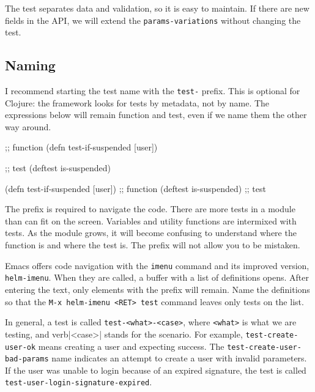 \fi

The test separates data and validation, so it is easy to maintain. If there are new fields in the API, we will extend the \verb|params-variations| without changing the test.

\subsection{Naming}

I recommend starting the test name with the \verb|test-| prefix. This is optional for Clojure: the framework looks for tests by metadata, not by name. The expressions below will remain function and test, even if we name them the other way around.

\ifx\DEVICETYPE\MOBILE

\begin{english}
  \begin{clojure}
;; function
(defn test-if-suspended [user])

;; test
(deftest is-suspended)
  \end{clojure}
\end{english}

\else

\begin{english}
  \begin{clojure}
(defn test-if-suspended [user]) ;; function
(deftest is-suspended)          ;; test
  \end{clojure}
\end{english}

\fi

The prefix is required to navigate the code. There are more tests in a module than can fit on the screen. Variables and utility functions are intermixed with tests. As the module grows, it will become confusing to understand where the function is and where the test is. The prefix will not allow you to be mistaken.


\mnoindent
Emacs offers code navigation with the \verb|imenu| command and its improved version, \verb|helm-imenu|. When they are called, a buffer with a list of definitions opens. After entering the text, only elements with the prefix will remain. Name the definitions so that the \verb|M-x helm-imenu <RET> test| command leaves only tests on the list.

In general, a test is called \verb|test-<what>-<case>|, where \verb|<what>| is what we are testing, and verb|<case>| stands for the scenario. For example, \verb|test-create-user-ok| means creating a user and expecting success. The \verb|test-create-user-bad-params| name indicates an attempt to create a user with invalid parameters. If the user was unable to login because of an expired signature, the test is called \verb|test-user-login-signature-expired|.

